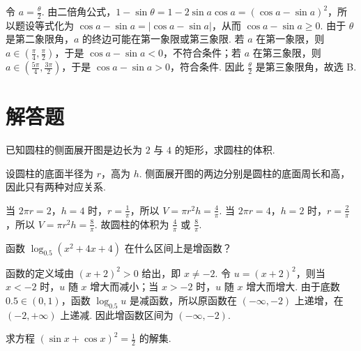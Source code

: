 \documentclass[UTF8,a4paper,oneside,11pt]{ctexbook}
\begin{document}
\begin{solution}
令 \(a=\frac{\theta}{2}\). 由二倍角公式，\(1-\sin\theta=1-2\sin a\cos a=(\cos a-\sin a)^2\)，所以题设等式化为 \(\cos a-\sin a=\lvert\cos a-\sin a\rvert\)，从而 \(\cos a-\sin a\geqslant0\). 由于 \(\theta\) 是第二象限角，\(a\) 的终边可能在第一象限或第三象限. 若 \(a\) 在第一象限，则 \(a\in\left(\frac{\pi}{4},\frac{\pi}{2}\right)\)，于是 \(\cos a-\sin a<0\)，不符合条件；若 \(a\) 在第三象限，则 \(a\in\left(\frac{5\pi}{4},\frac{3\pi}{2}\right)\)，于是 \(\cos a-\sin a>0\)，符合条件. 因此 \(\frac{\theta}{2}\) 是第三象限角，故选 B.
\end{solution}

\section{解答题}

\begin{problem}

已知圆柱的侧面展开图是边长为 \(2\) 与 \(4\) 的矩形，求圆柱的体积.
\end{problem}

\begin{solution}
设圆柱的底面半径为 \(r\)，高为 \(h\). 侧面展开图的两边分别是圆柱的底面周长和高，因此只有两种对应关系.

当 \(2\pi r=2\)，\(h=4\) 时，\(r=\frac{1}{\pi}\)，所以 \(V=\pi r^2h=\frac{4}{\pi}\). 当 \(2\pi r=4\)，\(h=2\) 时，\(r=\frac{2}{\pi}\)，所以 \(V=\pi r^2h=\frac{8}{\pi}\). 故圆柱的体积为 \(\frac{4}{\pi}\) 或 \(\frac{8}{\pi}\).
\end{solution}

\begin{problem}

函数 \(\log_{0.5}(x^2 + 4x + 4)\) 在什么区间上是增函数？
\end{problem}

\begin{solution}
函数的定义域由 \((x+2)^2>0\) 给出，即 \(x\neq-2\). 令 \(u=(x+2)^2\)，则当 \(x<-2\) 时，\(u\) 随 \(x\) 增大而减小；当 \(x>-2\) 时，\(u\) 随 \(x\) 增大而增大. 由于底数 \(0.5\in(0,1)\)，函数 \(\log_{0.5}u\) 是减函数，所以原函数在 \((-\infty,-2)\) 上递增，在 \((-2,+\infty)\) 上递减. 因此增函数区间为 \((-\infty,-2)\).
\end{solution}

\begin{problem}

求方程 \((\sin x + \cos x)^{2} = \frac{1}{2} \) 的解集.
\end{problem}
\end{document}
